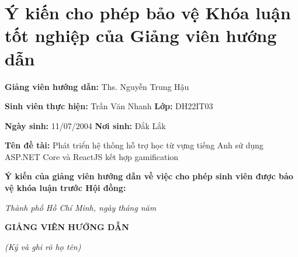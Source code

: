 \chapter*{Ý kiến cho phép bảo vệ Khóa luận tốt nghiệp của Giảng viên hướng dẫn}
\label{adviser}

\noindent\textbf{Giảng viên hướng dẫn:} Ths. Nguyễn Trung Hậu

\noindent\textbf{Sinh viên thực hiện:} Trần Văn Nhanh \quad \textbf{Lớp:} DH22IT03

\noindent\textbf{Ngày sinh:} 11/07/2004 \quad \textbf{Nơi sinh:} Đắk Lắk

\noindent\textbf{Tên đề tài:} Phát triển hệ thống hỗ trợ học từ vựng tiếng Anh sử dụng ASP.NET Core và ReactJS kết hợp gamification

\noindent\textbf{Ý kiến của giảng viên hướng dẫn về việc cho phép sinh viên được bảo vệ khóa luận trước Hội đồng:}


\vspace{1cm}
\noindent\dotfill

\vspace{0.5cm}
\noindent\dotfill

\vspace{0.5cm}
\noindent\dotfill

\vspace{0.5cm}
\noindent\dotfill

\vspace{0.5cm}
\noindent\dotfill

\vspace{0.5cm}
\noindent\dotfill

\vspace{1cm}
\noindent\textit{Thành phố Hồ Chí Minh, ngày \quad tháng \quad năm \quad}

\vspace{0.5cm}
\noindent\textbf{GIẢNG VIÊN HƯỚNG DẪN}

\vspace{0.2cm}
\noindent\textit{(Ký và ghi rõ họ tên)}